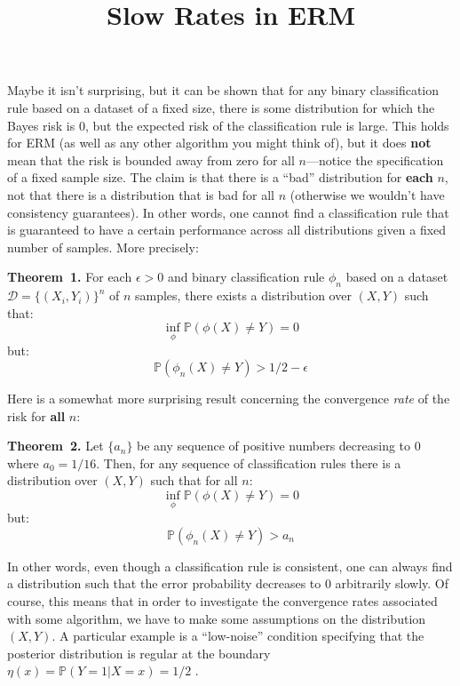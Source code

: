 \documentclass[12pt]{article}
\title{Slow Rates in ERM}
\newenvironment{theorem}[1][]{\par\medskip
   \noindent \textbf{Theorem~#1.} \rmfamily}{\medskip}
\begin{document}
\maketitle

Maybe it isn't surprising, but it can be shown that for any
binary classification rule based on a dataset of a fixed size, there
is some distribution for which the Bayes risk is $0$, but the expected risk of
the classification rule is large. This holds for ERM (as well as any other
algorithm you might think of), but it does \textbf{not} mean that the risk is
bounded away from zero for all $n$---notice the specification of a fixed
sample size. The claim is that there is a ``bad'' distribution for
\textbf{each} $n$, not that there is a distribution that is bad
for all $n$ (otherwise we wouldn't have consistency guarantees). In
other words, one cannot find a classification rule that is guaranteed
to have a certain performance across all distributions given a fixed
number of samples. More precisely:

\begin{theorem}[1]\label{theorem:1}
  For each $\epsilon > 0$ and binary classification rule $\phi_n$ based on a dataset \(\mathcal{D} =
  \{(X_i, Y_i)\}^n\) of $n$ samples, there exists a distribution over
  $(X, Y)$ such that:
  \[\inf_\phi\mathbb{P}(\phi(X) \neq Y) = 0\]
  but:
  \[\mathbb{P}(\phi_n(X) \neq Y) > 1/2 - \epsilon\]

\end{theorem}

Here is a somewhat more surprising result concerning the convergence \textit{rate}
of the risk for \textbf{all} $n$:

\begin{theorem}[2]
  Let $\{a_n\}$ be any sequence of positive numbers decreasing to $0$
  where $a_0=1/16$. Then, for any sequence of classification rules
  there is a distribution over $(X, Y)$ such that for all $n$:
  \[\inf_\phi\mathbb{P}(\phi(X) \neq Y) = 0\]
  but:
  \[\mathbb{P}(\phi_n(X) \neq Y) > a_n\]
\end{theorem}

In other words, even though a classification rule is consistent, one
can always find a distribution such that the error probability
decreases to $0$ arbitrarily slowly. Of course, this means that in order
to investigate the convergence rates associated with some algorithm,
we have to make some assumptions on the distribution $(X, Y)$. A
particular example is a ``low-noise'' condition specifying that the
posterior distribution is regular at the boundary $\eta(x) =
\mathbb{P}(Y =1 | X=x) = 1/2$ \cite{bartlett-2006-risk}.
\end{document}
